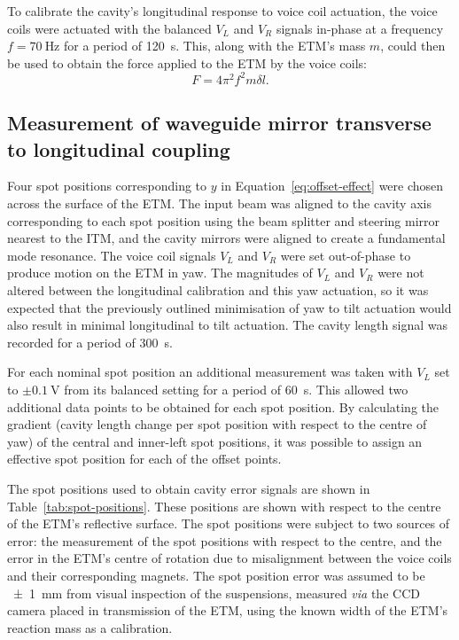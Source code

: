 To calibrate the cavity's longitudinal response to voice coil actuation, the voice coils were actuated with the balanced $V_L$ and $V_R$ signals in-phase at a frequency $f = \SI{70}{\hertz}$ for a period of \SI{120}{\second}. This, along with the \gls{ETM}'s mass $m$, could then be used to obtain the force applied to the \gls{ETM} by the voice coils:
\begin{equation}
  F = 4 \pi^2 f^2 m \delta l.
  \label{eq:force-calibration}
\end{equation}

\subsection{Measurement of waveguide mirror transverse to longitudinal coupling}
\label{sec:length-changes}


Four spot positions corresponding to $y$ in Equation~\ref{eq:offset-effect} were chosen across the surface of the \gls{ETM}. The input beam was aligned to the cavity axis corresponding to each spot position using the beam splitter and steering mirror nearest to the \gls{ITM}, and the cavity mirrors were aligned to create a fundamental mode resonance. The voice coil signals $V_L$ and $V_R$ were set out-of-phase to produce motion on the \gls{ETM} in yaw. The magnitudes of $V_L$ and $V_R$ were not altered between the longitudinal calibration and this yaw actuation, so it was expected that the previously outlined minimisation of yaw to tilt actuation would also result in minimal longitudinal to tilt actuation. The cavity length signal was recorded for a period of \SI{300}{\second}.

For each nominal spot position an additional measurement was taken with $V_L$ set to $\pm \SI{0.1}{\volt}$ from its balanced setting for a period of \SI{60}{\second}. This allowed two additional data points to be obtained for each spot position. By calculating the gradient (cavity length change per spot position with respect to the centre of yaw) of the central and inner-left spot positions, it was possible to assign an effective spot position for each of the offset points.

The spot positions used to obtain cavity error signals are shown in Table~\ref{tab:spot-positions}. These positions are shown with respect to the centre of the \gls{ETM}'s reflective surface. The spot positions were subject to two sources of error: the measurement of the spot positions with respect to the centre, and the error in the \gls{ETM}'s centre of rotation due to misalignment between the voice coils and their corresponding magnets. The spot position error was assumed to be \SI{\pm1}{\milli\meter} from visual inspection of the suspensions, measured \emph{via} the CCD camera placed in transmission of the \gls{ETM}, using the known width of the \gls{ETM}'s reaction mass as a calibration.

